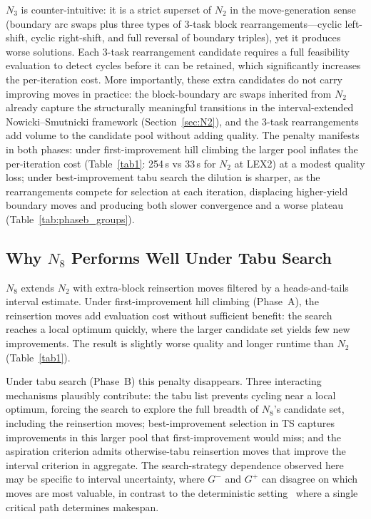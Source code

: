 \documentclass[preprint,12pt]{elsarticle}
\begin{document}
$N_3$ is counter-intuitive: it is a strict superset of $N_2$ in the move-generation sense (boundary arc swaps plus three types of 3-task block rearrangements---cyclic left-shift, cyclic right-shift, and full reversal of boundary triples), yet it produces worse solutions. Each 3-task rearrangement candidate requires a full feasibility evaluation to detect cycles before it can be retained, which significantly increases the per-iteration cost. More importantly, these extra candidates do not carry improving moves in practice: the block-boundary arc swaps inherited from $N_2$ already capture the structurally meaningful transitions in the interval-extended Nowicki--Smutnicki framework (Section~\ref{sec:N2}), and the 3-task rearrangements add volume to the candidate pool without adding quality. The penalty manifests in both phases: under first-improvement hill climbing the larger pool inflates the per-iteration cost (Table~\ref{tab1}: 254\,s vs 33\,s for $N_2$ at LEX2) at a modest quality loss; under best-improvement tabu search the dilution is sharper, as the rearrangements compete for selection at each iteration, displacing higher-yield boundary moves and producing both slower convergence and a worse plateau (Table~\ref{tab:phaseb_groups}).

\subsection{Why $N_8$ Performs Well Under Tabu Search}
\label{sec:N8-tabu}

$N_8$ extends $N_2$ with extra-block reinsertion moves filtered by a heads-and-tails interval estimate. Under first-improvement hill climbing (Phase~A), the reinsertion moves add evaluation cost without sufficient benefit: the search reaches a local optimum quickly, where the larger candidate set yields few new improvements. The result is slightly worse quality and longer runtime than $N_2$ (Table~\ref{tab1}).

Under tabu search (Phase~B) this penalty disappears. Three interacting mechanisms plausibly contribute: the tabu list prevents cycling near a local optimum, forcing the search to explore the full breadth of $N_8$'s candidate set, including the reinsertion moves; best-improvement selection in TS captures improvements in this larger pool that first-improvement would miss; and the aspiration criterion admits otherwise-tabu reinsertion moves that improve the interval criterion in aggregate. The search-strategy dependence observed here may be specific to interval uncertainty, where $G^-$ and $G^+$ can disagree on which moves are most valuable, in contrast to the deterministic setting~\cite{Xie2022} where a single critical path determines makespan.
\end{document}
